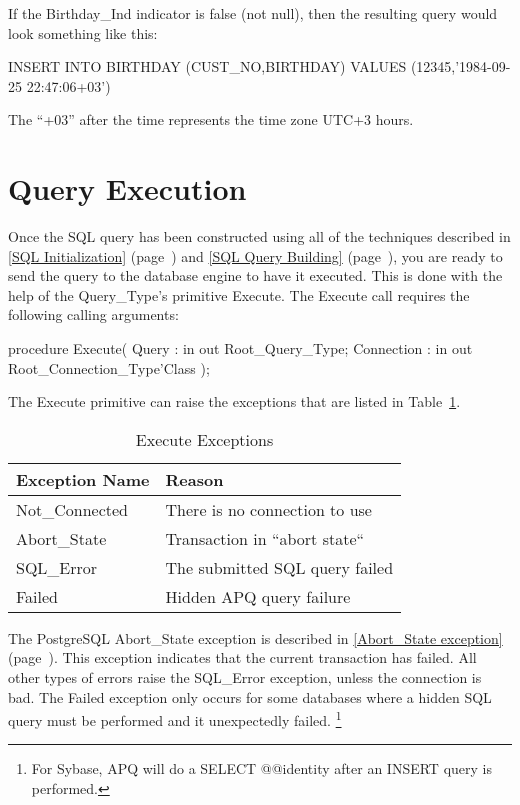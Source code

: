 \documentclass[english,letterpaper]{book}
\newcommand\Ref[1]{\textsection\ref{#1} (page~\pageref{#1})}
\begin{document}
If the Birthday\_Ind indicator is false (not null),
then the resulting query would look something like this:

\begin{SQL}
INSERT INTO BIRTHDAY (CUST_NO,BIRTHDAY)
VALUES (12345,'1984-09-25 22:47:06+03')
\end{SQL}
The ``+03'' after the time represents the time zone UTC+3
hours.


\section{Query Execution}

Once the SQL query has been constructed using all of the techniques
described in \Ref{SQL Initialization} and \Ref{SQL Query Building},
you are ready to send the query to the database engine to have it
executed. This is done with the help of the Query\_Type's primitive
Execute. The Execute call requires the following calling arguments:

\begin{Code}
procedure Execute(
   Query :      in out Root_Query_Type;
   Connection : in out Root_Connection_Type'Class
);
\end{Code}

The Execute primitive can raise the exceptions that are listed
in Table~\ref{t:exx}.

\begin{table}
   \begin{center}
      \begin{tabular}{ll}
         Exception Name &  Reason\\
         \hline 
         Not\_Connected &  There is no connection to use\\
         Abort\_State   &  Transaction in {}``abort state{}``\\
         SQL\_Error     &  The submitted SQL query failed\\
         Failed         &  Hidden APQ query failure\\
      \end{tabular}
   \end{center}
   \caption{Execute Exceptions}\label{t:exx}
\end{table}

The PostgreSQL Abort\_State
exception is described in \Ref{Abort_State exception}. This exception indicates that
the current transaction has failed. All other types of errors raise
the SQL\_Error exception, unless the connection is bad. The Failed
exception only occurs for some databases where a hidden SQL query
must be performed and it unexpectedly failed.%
\footnote{For Sybase, APQ will do a SELECT @@identity after an INSERT query
is performed.%
}
\end{document}
